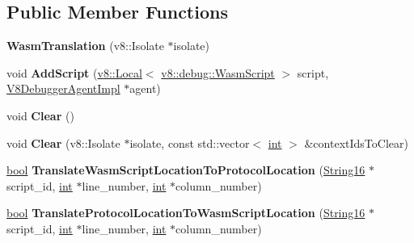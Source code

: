 \subsection*{Public Member Functions}
\begin{DoxyCompactItemize}
\item 
\mbox{\label{classv8__inspector_1_1WasmTranslation_a409505a466b2a1b2b4ef6cbcf7caf32f}} 
{\bfseries Wasm\+Translation} (v8\+::\+Isolate $\ast$isolate)
\item 
\mbox{\label{classv8__inspector_1_1WasmTranslation_ab9fde8cf46e1aaa10c9c644d82d7a098}} 
void {\bfseries Add\+Script} (\mbox{\hyperlink{classv8_1_1Local}{v8\+::\+Local}}$<$ \mbox{\hyperlink{classv8_1_1debug_1_1WasmScript}{v8\+::debug\+::\+Wasm\+Script}} $>$ script, \mbox{\hyperlink{classv8__inspector_1_1V8DebuggerAgentImpl}{V8\+Debugger\+Agent\+Impl}} $\ast$agent)
\item 
\mbox{\label{classv8__inspector_1_1WasmTranslation_af8be8426dba3eaa99fc551bed9358705}} 
void {\bfseries Clear} ()
\item 
\mbox{\label{classv8__inspector_1_1WasmTranslation_abf086eed10b030ba8ec5521ab6347442}} 
void {\bfseries Clear} (v8\+::\+Isolate $\ast$isolate, const std\+::vector$<$ \mbox{\hyperlink{classint}{int}} $>$ \&context\+Ids\+To\+Clear)
\item 
\mbox{\label{classv8__inspector_1_1WasmTranslation_a0ba657d87620afeb33ace4e6ef48dbff}} 
\mbox{\hyperlink{classbool}{bool}} {\bfseries Translate\+Wasm\+Script\+Location\+To\+Protocol\+Location} (\mbox{\hyperlink{classv8__inspector_1_1String16}{String16}} $\ast$script\+\_\+id, \mbox{\hyperlink{classint}{int}} $\ast$line\+\_\+number, \mbox{\hyperlink{classint}{int}} $\ast$column\+\_\+number)
\item 
\mbox{\label{classv8__inspector_1_1WasmTranslation_a79d2f8e219a487e8256cab390eb68ffe}} 
\mbox{\hyperlink{classbool}{bool}} {\bfseries Translate\+Protocol\+Location\+To\+Wasm\+Script\+Location} (\mbox{\hyperlink{classv8__inspector_1_1String16}{String16}} $\ast$script\+\_\+id, \mbox{\hyperlink{classint}{int}} $\ast$line\+\_\+number, \mbox{\hyperlink{classint}{int}} $\ast$column\+\_\+number)

\end{DoxyCompactItemize}
